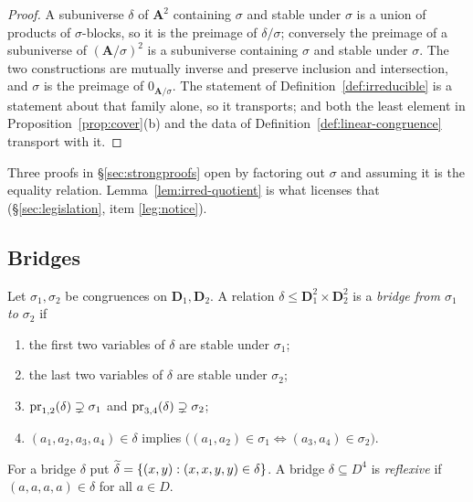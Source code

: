\begin{proof}
A subuniverse $\delta$ of $\mathbf A^{2}$ containing $\sigma$ and stable under
$\sigma$ is a union of products of $\sigma$-blocks, so it is the preimage of
$\delta/\sigma$; conversely the preimage of a subuniverse of
$(\mathbf A/\sigma)^{2}$ is a subuniverse containing $\sigma$ and stable under
$\sigma$. The two constructions are mutually inverse and preserve inclusion and
intersection, and $\sigma$ is the preimage of $0_{\mathbf A/\sigma}$. The
statement of Definition~\ref{def:irreducible} is a statement about that family
alone, so it transports; and both the least element in
Proposition~\ref{prop:cover}(b) and the data of
Definition~\ref{def:linear-congruence} transport with it.
\end{proof}

\begin{hazard}[This is the licence for ``assume $\sigma=0$'']\label{haz:factor-out}
Three proofs in \S\ref{sec:strongproofs} open by factoring out $\sigma$ and
assuming it is the equality relation. Lemma~\ref{lem:irred-quotient} is what
licenses that (\S\ref{sec:legislation}, item \ref{leg:notice}).
\end{hazard}

\subsection{Bridges}

\begin{definition}[Bridge]\label{def:bridge}
Let $\sigma_{1},\sigma_{2}$ be congruences on $\mathbf D_{1},\mathbf D_{2}$. A
relation $\delta\le\mathbf D_{1}^{2}\times\mathbf D_{2}^{2}$ is a \emph{bridge
from $\sigma_{1}$ to $\sigma_{2}$} if
\begin{enumerate}\alphlabels\tightlist
\item the first two variables of $\delta$ are stable under $\sigma_{1}$;
\item the last two variables of $\delta$ are stable under $\sigma_{2}$;
\item $\operatorname*{pr}_{1,2}(\delta)\supsetneq\sigma_{1}$ and
      $\operatorname*{pr}_{3,4}(\delta)\supsetneq\sigma_{2}$;
\item $(a_{1},a_{2},a_{3},a_{4})\in\delta$ implies
      $\bigl((a_{1},a_{2})\in\sigma_{1}\iff(a_{3},a_{4})\in\sigma_{2}\bigr)$.
\end{enumerate}
For a bridge $\delta$ put $\widetilde{\delta}=\{(x,y):(x,x,y,y)\in\delta\}$.
A bridge $\delta\subseteq D^{4}$ is \emph{reflexive} if $(a,a,a,a)\in\delta$
for all $a\in D$.
\end{definition}

